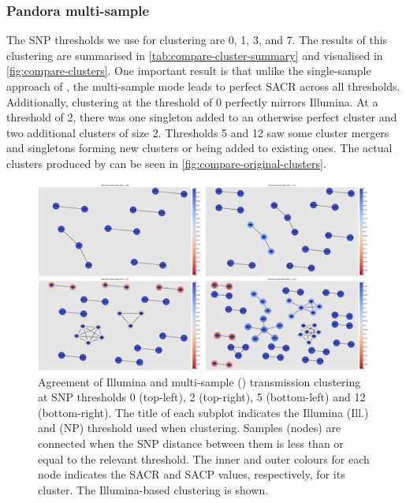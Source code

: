 \subsubsection{Pandora multi-sample}

The SNP thresholds we use for \compare{} clustering are 0, 1, 3, and 7. The results of this clustering are summarised in \autoref{tab:compare-cluster-summary} and visualised in \autoref{fig:compare-clusters}. One important result is that unlike the single-sample approach of \pandora{}, the multi-sample mode leads to perfect SACR across all thresholds. Additionally, clustering at the threshold of 0 perfectly mirrors Illumina. At a threshold of 2, there was one singleton added to an otherwise perfect cluster and two additional clusters of size 2. Thresholds 5 and 12 saw some cluster mergers and singletons forming new clusters or being added to existing ones. The actual clusters produced by \compare{} can be seen in \autoref{fig:compare-original-clusters}.

\begin{figure}
\begin{center}
\includegraphics[width=0.90\columnwidth]{Chapter2/Figs/pandora_compare_clusters.png}
\caption{{Agreement of Illumina and \pandora{} multi-sample (\ont{}) transmission clustering at SNP thresholds 0 (top-left), 2 (top-right), 5 (bottom-left) and 12 (bottom-right). The title of each subplot indicates the Illumina (Ill.) and \ont{} (NP) threshold used when clustering. Samples (nodes) are connected when the SNP distance between them is less than or equal to the relevant threshold. The inner and outer colours for each node indicates the SACR and SACP values, respectively, for its cluster. The Illumina-based clustering is shown.
{\label{fig:compare-clusters}}%
}}
\end{center}
\end{figure}


